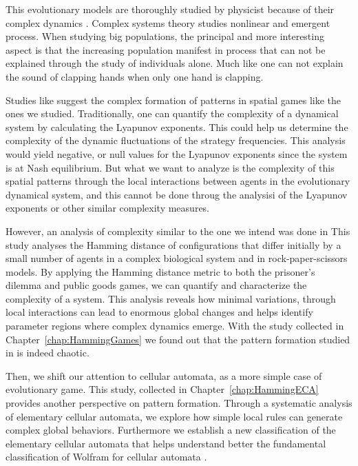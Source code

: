 This evolutionary models are thoroughly studied by physicist because of their complex dynamics \cite{GamesComplex}. Complex systems theory studies nonlinear and emergent process. When studying big populations, the principal and more interesting aspect is that the increasing population manifest in process that can not be explained through the study of individuals alone. Much like one can not explain the sound of clapping hands when only one hand is clapping.

Studies like \cite{SpatialChaos} suggest the complex formation of patterns in spatial games like the ones we studied. Traditionally, one can quantify the complexity of a dynamical system by calculating the Lyapunov exponents. This could help us determine the complexity of the dynamic fluctuations of the strategy frequencies. This analysis would yield negative, or null values for the Lyapunov exponents since the system is at Nash equilibrium. But what we want to analyze is the complexity of this spatial patterns through the local interactions between agents in the evolutionary dynamical system, and this cannot be done throug the analysisi of the Lyapunov exponents or other similar complexity measures. 

However, an analysis of complexity similar to the one we intend was done in \cite{HammingChaos1,HammingChaos2} This study analyses the Hamming distance of configurations that differ initially by a small number of agents in a complex biological system and in rock-paper-scissors models. By applying the Hamming distance metric to both the prisoner's dilemma and public goods games, we can quantify and characterize the complexity of a system. This analysis reveals how minimal variations, through local interactions can lead to enormous global changes and helps identify parameter regions where complex dynamics emerge. With the study collected in Chapter~\ref{chap:HammingGames} we found out that the pattern formation studied in \cite{SpatialChaos} is indeed chaotic. 

Then, we shift our attention to cellular automata, as a more simple case of evolutionary game. This study, collected in Chapter~\ref{chap:HammingECA} provides another perspective on pattern formation. Through a systematic analysis of elementary cellular automata, we explore how simple local rules can generate complex global behaviors. Furthermore we establish a new classification of the elementary cellular automata that helps understand better the fundamental classification of Wolfram for cellular automata \cite{WolframClass}.

